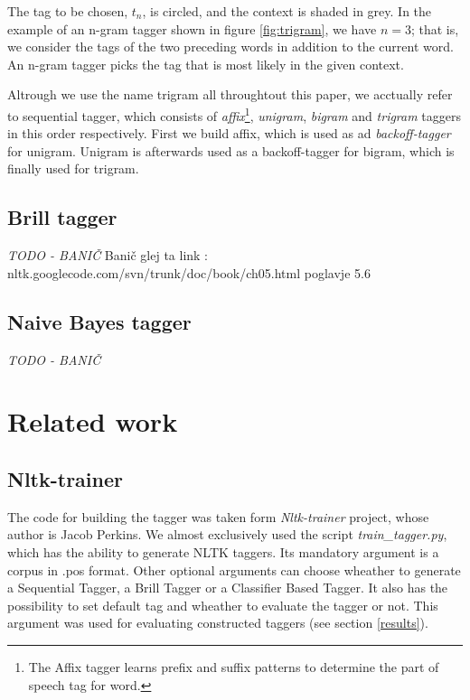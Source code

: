 \documentclass[10pt, conference, compsocconf]{IEEEtran}
\begin{document}
The tag to be chosen, $t_{n}$, is circled, and the context is shaded in grey.
In the example of an n-gram tagger shown in figure \ref{fig:trigram}, we have $n=3$; that is, we consider the tags of the two preceding words in addition to the current word.
An n-gram tagger picks the tag that is most likely in the given context.
\par
Altrough we use the name trigram all throughtout this paper, we acctually refer to sequential tagger, which consists of
\textit{affix}\footnote{The Affix tagger learns prefix and suffix patterns to determine the part of speech tag for word.}, \textit{unigram}, \textit{bigram} and \textit{trigram} taggers in this order respectively. First we build affix, which is used as ad \textit{backoff-tagger} for unigram. Unigram is afterwards used as a backoff-tagger for bigram, which is finally used for trigram.

\subsection{Brill tagger} %
\textit{TODO - BANIČ}
Banič glej ta link : nltk.googlecode.com/svn/trunk/doc/book/ch05.html
poglavje 5.6
\subsection{Naive Bayes tagger} %
\textit{TODO - BANIČ}

\section{Related work}
\subsection{Nltk-trainer} %
The code for building the tagger was taken form \textit{Nltk-trainer}\cite{nltk-trainer} project, whose author is Jacob Perkins.
We almost exclusively used the script \textit{train\_tagger.py}, which has the ability to generate NLTK taggers.
Its mandatory argument is a corpus in .pos format.
Other optional arguments can choose wheather to generate a Sequential Tagger, a Brill Tagger or a Classifier Based Tagger.
It also has the possibility to set default tag and wheather to evaluate the tagger or not.
This argument was used for evaluating constructed taggers (see section \ref{results}). 
\end{document}
